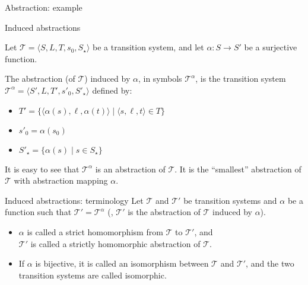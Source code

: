 \documentclass{gkibeamer}
\begin{document}
\begin{frame}{Abstraction: example}
  \begin{center}
  \end{center}
\end{frame}

\begin{frame}{Induced abstractions}
  \begin{definition}
    Let $\mathcal T = \langle S, L, T, s_0, S_\star\rangle$ be a transition
    system, and let $\alpha: S \to S'$ be a surjective function.

    \smallskip

    The \alert{abstraction (of $\mathcal T$) induced by $\alpha$},
    in symbols $\mathcal T^\alpha$, is the transition system $\mathcal
    T^\alpha = \langle S', L, T', s'_0, S'_\star\rangle$ defined by:
    \begin{itemize}
    \item $T' = \{\langle \alpha(s), \ell, \alpha(t)\rangle \mid
      \langle s, \ell, t\rangle \in T\}$
    \item $s'_0 = \alpha(s_0)$
    \item $S'_\star = \{ \alpha(s) \mid s \in S_\star \}$
    \end{itemize}
  \end{definition}
   It is easy to see that $\mathcal T^\alpha$ is
  an abstraction of $\mathcal T$. It is the ``\alert{smallest}''
  abstraction of $\mathcal T$ with abstraction mapping $\alpha$.
\end{frame}

\begin{frame}{Induced abstractions: terminology}
  Let $\mathcal T$ and $\mathcal T'$ be transition systems and
  $\alpha$ be a function such that $\mathcal T' = \mathcal T^\alpha$
  (\ie, $\mathcal T'$ is the abstraction of $\mathcal T$ induced by
  $\alpha$).
  \begin{itemize}
  \item $\alpha$ is called a \alert{strict homomorphism}
    from $\mathcal T$ to $\mathcal T'$, and \\
    $\mathcal T'$ is called a \alert{strictly homomorphic abstraction} of
    $\mathcal T$.
  \item If $\alpha$ is bijective, it is called an \alert{isomorphism}
    between $\mathcal T$ and $\mathcal T'$, and
    the two transition systems are called \alert{isomorphic}.
  \end{itemize}
\end{frame}
\end{document}
